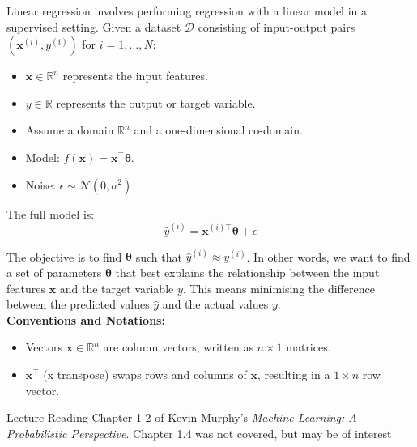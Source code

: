 Linear regression involves performing regression with a linear model in a supervised setting. Given a dataset \(\mathcal{D}\) consisting of input-output pairs \((\bm{x}^{(i)}, y^{(i)})\) for \(i = 1, \ldots, N\):
\begin{itemize}
    \item \(\bm{x} \in \mathbb{R}^n\) represents the input features.
    \item \(y \in \mathbb{R}\) represents the output or target variable.
    \item Assume a domain \(\mathbb{R}^n\) and a one-dimensional co-domain.
    \item Model: \(f(\bm{x}) = \bm{x}^\top \bm{\theta}\).
    \item Noise: \(\epsilon \sim \mathcal{N}(0, \sigma^2)\).
\end{itemize}
The full model is:
\[
\hat{y}^{(i)} = \bm{x}^{(i)\top} \bm{\theta} + \epsilon
\]

The objective is to find \(\bm{\theta}\) such that \(\hat{y}^{(i)} \approx y^{(i)}\). In other words, we want to find a set of parameters \(\bm{\theta}\) that best explains the relationship between the input features \(\bm{x}\) and the target variable \(y\). This means minimising the difference between the predicted values \(\hat{y}\) and the actual values \(y\).\\

\textbf{Conventions and Notations:}
\begin{itemize}
    \item Vectors \(\bm{x} \in \mathbb{R}^n\) are column vectors, written as \(n \times 1\) matrices.
    \item \(\bm{x}^\top\) (x transpose) swaps rows and columns of \(\bm{x}\), resulting in a \(1 \times n\) row vector.
\end{itemize}




\begin{referencebox}{Lecture Reading}
    Chapter 1-2 of Kevin Murphy's \textit{Machine Learning: A Probabilistic Perspective}. Chapter 1.4 was not covered, but may be of interest
\end{referencebox}